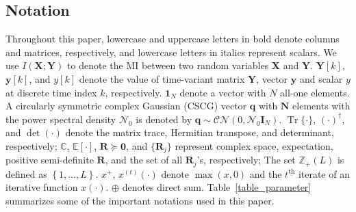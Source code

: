 \documentclass[9pt,journal]{IEEEtran}
\DeclareMathOperator{\trace}{Tr}
\newcommand{\paren}[1]{\left({#1}\right)}
\newcommand{\bracket}[1]{{\left [{#1}\right ]}}
\newcommand{\ith}[1]    {{#1}^{\underline{\text{th}}}}
\begin{document}
\subsection*{Notation}
Throughout this paper, lowercase and uppercase letters in bold denote columns and matrices, respectively, and lowercase letters in italics represent scalars. We use $I(\mathbf{X};\mathbf{Y})$ to denote the MI between two random variables $\mathbf{X}$ and $\mathbf{Y}$. $\mathbf{Y}\bracket{k}$, $\mathbf{y}\bracket{k}$, and $y\bracket{k}$ denote the value of time-variant matrix $\mathbf{Y}$, vector $\mathbf{y}$ and scalar $y$ at discrete time index $k$,  respectively. $\mathbf{1}_{\mathit{N}}$ denote a vector with $\mathit{N}$ all-one elements. A circularly symmetric complex Gaussian (CSCG) vector $\mathbf{q}$ with $\mathbf{N}$ elements with the power spectral density $\mathcal{N}_0$ is denoted by $\mathbf{q}\sim\mathcal{CN}(0,\mathcal{N}_0\mathbf{I}_{\mathit{N}})$. $\trace\{\cdot\}$, $(\cdot)^\dagger$, and $\det(\cdot)$ denote the matrix trace, Hermitian transpose, and determinant, respectively; $\mathbb{C}$, $\mathbb{E}[\cdot]$, $\mathbf{R}\succeq\mathbf{0}$, and $\{\mathbf{R}_j\}$ represent complex space, expectation, positive semi-definite $\mathbf{R}$, and the set of all $\mathbf{R}_j$'s, respectively; The set $\mathbb{Z}_{+}(L)$ is defined as $\left\lbrace1,\dots,L\right\rbrace$. $x^+$, $x^{\paren{t}}\paren{\cdot}$ denote $\max(x,0)$ and the $\ith{t}$ iterate of an iterative function $x\paren{\cdot}$. $\oplus$ denotes direct sum.
Table~\ref{table_parameter} summarizes some of the important notations used in this paper.
\end{document}
